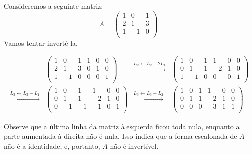 \begin{example}
    Consideremos a seguinte matriz:
    \begin{equation*}
        A = \begin{pmatrix}
            1 & 0 & 1 \\
            2 & 1 & 3 \\
            1 & -1 & 0 \\
        \end{pmatrix}.
    \end{equation*}
    Vamos tentar invertê-la.

    \begin{align*}
        &\left(
        \begin{array}{ccc|ccc}
            1 & 0 & 1 & 1 & 0 & 0 \\
            2 & 1 & 3 & 0 & 1 & 0 \\
            1 & -1 & 0 & 0 & 0 & 1 \\
        \end{array}
        \right)
        &
        \xrightarrow{L_2 \leftarrow L_2 - 2L_1}
        &
        \left(
        \begin{array}{ccc|ccc}
            1 & 0 & 1 & 1 & 0 & 0 \\
            0 & 1 & 1 & -2 & 1 & 0 \\
            1 & -1 & 0 & 0 & 0 & 1 \\
        \end{array}
        \right) \\
        \xrightarrow{L_3 \leftarrow L_3 - L_1}
        &
        \left(
        \begin{array}{ccc|ccc}
            1 & 0 & 1 & 1 & 0 & 0 \\
            0 & 1 & 1 & -2 & 1 & 0 \\
            0 & -1 & -1 & -1 & 0 & 1 \\
        \end{array}
        \right)
        &
        \xrightarrow{L_3 \leftarrow L_3 + L_2}
        &
        \left(
        \begin{array}{ccc|ccc}
            1 & 0 & 1 & 1 & 0 & 0 \\
            0 & 1 & 1 & -2 & 1 & 0 \\
            0 & 0 & 0 & -3 & 1 & 1 \\
        \end{array}
        \right)
    \end{align*}

    Observe que a última linha da matriz à esquerda ficou toda nula, enquanto a parte aumentada à direita não é nula.
    Isso indica que a forma escalonada de $A$ não é a identidade, e, portanto, $A$ não é invertível.
\end{example}

